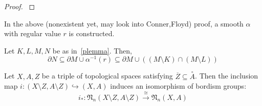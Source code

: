\documentclass[a4paper,11pt]{article}
\begin{document}
\begin{proof}\cite{zhang}
\end{proof}

In the above (nonexistent yet, may look into Conner,Floyd) proof, a smooth \(\alpha\) with regular value \(r\) is constructed.

\begin{lemma}\label{plemma2}
    Let \(K,L,M,N\) be as in\ \ref{plemma}. Then,
    \[\partial N\subseteq \partial M\cup \alpha^{-1}(r)\subseteq \partial M\cup((M\setminus K)\cap(M\setminus L))\]
\end{lemma}

\begin{lemma}\label{excision}
    Let \(X,A,Z\) be a triple of topological spaces satisfying \(\overline{Z}\subseteq\overset{\circ}{A}\). Then the inclusion map \(i:(X\setminus Z,A\setminus Z)\hookrightarrow(X,A)\) induces an isomorphism of bordism groups:
    \[i_\ast:\mathfrak{N}_n(X\setminus Z,A\setminus Z)\xrightarrow{\cong}\mathfrak{N}_n(X,A)\]
\end{lemma}
\end{document}

